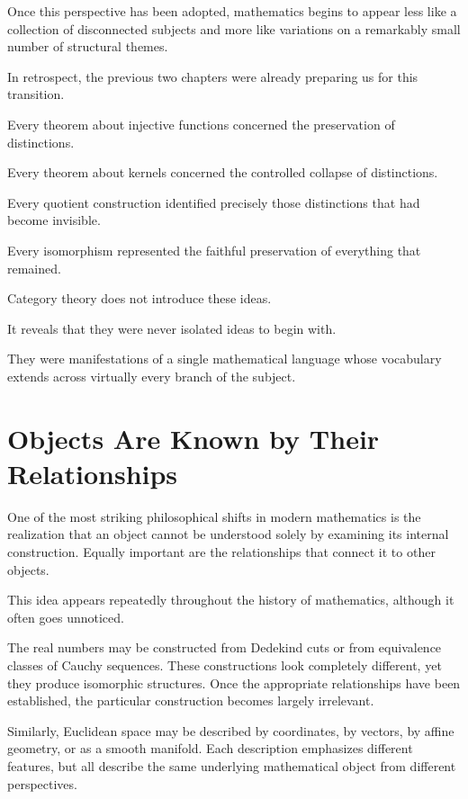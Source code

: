 \documentclass[11pt]{book}
\numberwithin{equation}{chapter}
\theoremstyle{definition}
\theoremstyle{plain}
\theoremstyle{remark}
\begin{document}
Once this perspective has been adopted, mathematics begins to appear less like a collection of disconnected subjects and more like variations on a remarkably small number of structural themes.

In retrospect, the previous two chapters were already preparing us for this transition.

Every theorem about injective functions concerned the preservation of distinctions.

Every theorem about kernels concerned the controlled collapse of distinctions.

Every quotient construction identified precisely those distinctions that had become invisible.

Every isomorphism represented the faithful preservation of everything that remained.

Category theory does not introduce these ideas.

It reveals that they were never isolated ideas to begin with.

They were manifestations of a single mathematical language whose vocabulary extends across virtually every branch of the subject.


\section{Objects Are Known by Their Relationships}

One of the most striking philosophical shifts in modern mathematics is the realization that an object cannot be understood solely by examining its internal construction. Equally important are the relationships that connect it to other objects.

This idea appears repeatedly throughout the history of mathematics, although it often goes unnoticed.

The real numbers may be constructed from Dedekind cuts or from equivalence classes of Cauchy sequences. These constructions look completely different, yet they produce isomorphic structures. Once the appropriate relationships have been established, the particular construction becomes largely irrelevant.

Similarly, Euclidean space may be described by coordinates, by vectors, by affine geometry, or as a smooth manifold. Each description emphasizes different features, but all describe the same underlying mathematical object from different perspectives.
\end{document}
